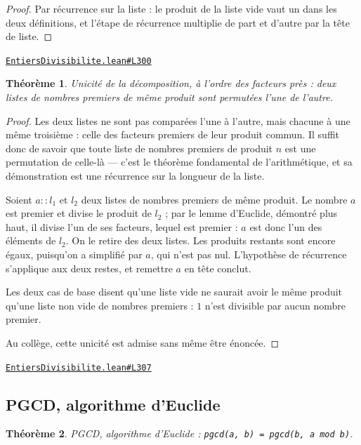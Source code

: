 \documentclass[11pt,a4paper]{article}
\theoremstyle{definition}
\theoremstyle{plain}
\newtheorem{theoreme}{Théorème}
\newcommand{\source}[2]{\par\smallskip\noindent\hfill{\footnotesize\href{#1}{\texttt{#2}}}\par\smallskip}
\begin{document}
\begin{proof}
Par récurrence sur la liste : le produit de la liste vide vaut un dans les deux
définitions, et l'étape de récurrence multiplie de part et d'autre par la tête de liste.
\end{proof}
\source{https://github.com/Commutator-IO/learn-lean/blob/main/courses/01-college/01-nombres-et-calculs/EntiersDivisibilite.lean\#L300}{EntiersDivisibilite.lean\#L300}

\begin{theoreme}
Unicité de la décomposition, à l'ordre des facteurs près : deux listes de nombres
premiers de même produit sont permutées l'une de l'autre.
\end{theoreme}

\begin{proof}
Les deux listes ne sont pas comparées l'une à l'autre, mais chacune à une même troisième :
celle des facteurs premiers de leur produit commun. Il suffit donc de savoir que toute liste
de nombres premiers de produit $n$ est une permutation de celle-là — c'est le théorème
fondamental de l'arithmétique, et sa démonstration est une récurrence sur la longueur de la
liste.

Soient $a :: l_1$ et $l_2$ deux listes de nombres premiers de même produit. Le nombre $a$
est premier et divise le produit de $l_2$ ; par le lemme d'Euclide, démontré plus haut, il
divise l'un de ses facteurs, lequel est premier : $a$ est donc l'un des éléments de $l_2$.
On le retire des deux listes. Les produits restants sont encore égaux, puisqu'on a simplifié
par $a$, qui n'est pas nul. L'hypothèse de récurrence s'applique aux deux restes, et
remettre $a$ en tête conclut.

Les deux cas de base disent qu'une liste vide ne saurait avoir le même produit qu'une liste
non vide de nombres premiers : $1$ n'est divisible par aucun nombre premier.

Au collège, cette unicité est admise sans même être énoncée.
\end{proof}
\source{https://github.com/Commutator-IO/learn-lean/blob/main/courses/01-college/01-nombres-et-calculs/EntiersDivisibilite.lean\#L307}{EntiersDivisibilite.lean\#L307}

\subsection{PGCD, algorithme d'Euclide}

\begin{theoreme}
PGCD, algorithme d'Euclide : \texttt{pgcd(a, b) = pgcd(b, a mod b)}.
\end{theoreme}
\end{document}
